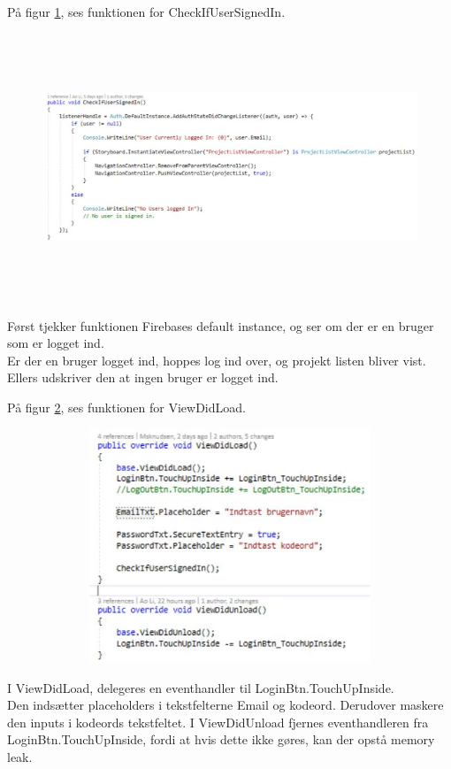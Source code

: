 På figur \ref{fig:Checkifusersigned}, ses funktionen for CheckIfUserSignedIn.
\begin{figure}[H] %
	\centering
	\includegraphics[height=8cm, width=15cm]{../ArkitekturDesign/Design/Login/Checkifusersigned}
	\caption{}
	\label{fig:Checkifusersigned}
\end{figure}
Først tjekker funktionen Firebases default instance, og ser om der er en bruger som er logget ind. \\
Er der en bruger logget ind, hoppes log ind over, og projekt listen bliver vist. \\
Ellers udskriver den at ingen bruger er logget ind.

På figur \ref{fig:ViewDidLoad}, ses funktionen for ViewDidLoad.
\begin{figure}[H] %
	\centering
	\includegraphics[height=7cm, width=12cm]{../ArkitekturDesign/Design/Login/ViewDidLoad}
	\caption{}
	\label{fig:ViewDidLoad}
\end{figure}

\clearpage

I ViewDidLoad, delegeres en eventhandler til LoginBtn.TouchUpInside. \\
Den indsætter placeholders i tekstfelterne Email og kodeord. Derudover maskere den inputs i kodeords tekstfeltet.
I ViewDidUnload fjernes eventhandleren fra LoginBtn.TouchUpInside, fordi at hvis dette ikke gøres, kan der opstå memory leak. \\


